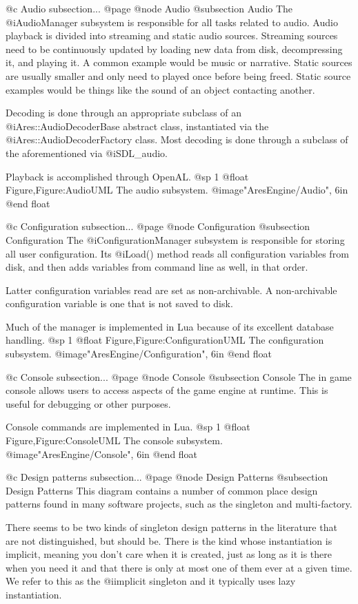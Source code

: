 @c Audio subsection...
@page
@node Audio
@subsection Audio
The @i{AudioManager} subsystem is responsible for all tasks related to audio. Audio playback is divided into streaming and static audio sources. Streaming sources need to be continuously updated by loading new data from disk, decompressing it, and playing it. A common example would be music or narrative. Static sources are usually smaller and only need to played once before being freed. Static source examples would be things like the sound of an object contacting another.

Decoding is done through an appropriate subclass of an @i{Ares::AudioDecoderBase} abstract class, instantiated via the @i{Ares::AudioDecoderFactory} class. Most decoding is done through a subclass of the aforementioned via @i{SDL_audio}.

Playback is accomplished through OpenAL.
@sp 1
@float Figure,Figure:AudioUML
The audio subsystem.
@image{"AresEngine/Audio", 6in}
@end float

@c Configuration subsection...
@page
@node Configuration
@subsection Configuration
The @i{ConfigurationManager} subsystem is responsible for storing all user configuration. Its @i{Load()} method reads all configuration variables from disk, and then adds variables from command line as well, in that order. 

Latter configuration variables read are set as non-archivable. A non-archivable configuration variable is one that is not saved to disk.

Much of the manager is implemented in Lua because of its excellent database handling.
@sp 1
@float Figure,Figure:ConfigurationUML
The configuration subsystem.
@image{"AresEngine/Configuration", 6in}
@end float

@c Console subsection...
@page
@node Console
@subsection Console
The in game console allows users to access aspects of the game engine at runtime. This is useful for debugging or other purposes.

Console commands are implemented in Lua.
@sp 1
@float Figure,Figure:ConsoleUML
The console subsystem.
@image{"AresEngine/Console", 6in}
@end float

@c Design patterns subsection...
@page
@node Design Patterns
@subsection Design Patterns
This diagram contains a number of common place design patterns found in many software projects, such as the singleton and multi-factory. 

There seems to be two kinds of singleton design patterns in the literature that are not distinguished, but should be. There is the kind whose instantiation is implicit, meaning you don't care when it is created, just as long as it is there when you need it and that there is only at most one of them ever at a given time. We refer to this as the @i{implicit singleton} and it typically uses lazy instantiation.

